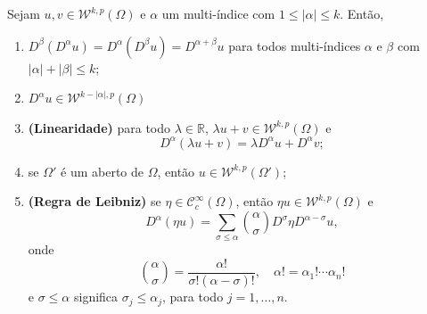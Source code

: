 \documentclass[a4paper, 11pt]{book}
\theoremstyle{definition}
\newcommand{\bR}{\mathbb{R}}
\newcommand{\cC}{\mathcal{C}}
\newcommand{\cW}{\mathcal{W}}
\begin{document}
\begin{tbox} \label{thm:propriedades-derivada-fraca}
    Sejam $u, v \in \cW^{k,p}(\Omega)$ e $\alpha$ um multi-índice com $1 \leqslant |\alpha| \leqslant k$.
    Então,
    \begin{enumerate}[leftmargin=*, label=\textbf{(\alph*)}]
        \item $D^\beta(D^\alpha u) = D^\alpha (D^\beta u) = D^{\alpha + \beta} u$ para todos multi-índices $\alpha$ e $\beta$ com $|\alpha| + |\beta| \leqslant k$;
        \item $D^\alpha u \in \cW^{k - |\alpha|,p}(\Omega)$
        \item \textbf{(Linearidade)} para todo $\lambda \in \bR$, $\lambda u + v \in \cW^{k,p}(\Omega)$ e
        \[
            D^{\alpha}(\lambda u + v) = \lambda D^\alpha u + D^\alpha v;
        \]
        \item se $\Omega'$ é um aberto de $\Omega$, então $u \in \cW^{k,p}(\Omega')$;
        \item \textbf{(Regra de Leibniz)} se $\eta \in \cC^\infty_c(\Omega)$, então $\eta u \in \cW^{k,p}(\Omega)$ e
        \begin{equation} \label{eq:regra-de-leibniz}
            D^\alpha (\eta u) = \sum_{\sigma \leqslant \alpha} \binom{\alpha}{\sigma} D^{\sigma} \eta D^{\alpha - \sigma} u,
        \end{equation}
        onde
        \[
            \binom{\alpha}{\sigma} = \frac{\alpha!}{\sigma!(\alpha - \sigma)!}, \quad \alpha! = \alpha_1!\cdots \alpha_n!
        \]
        e $\sigma \leqslant \alpha$ significa $\sigma_j \leqslant \alpha_j$, para todo $j = 1,\dots,n$.
    \end{enumerate}
\end{tbox}
\end{document}

